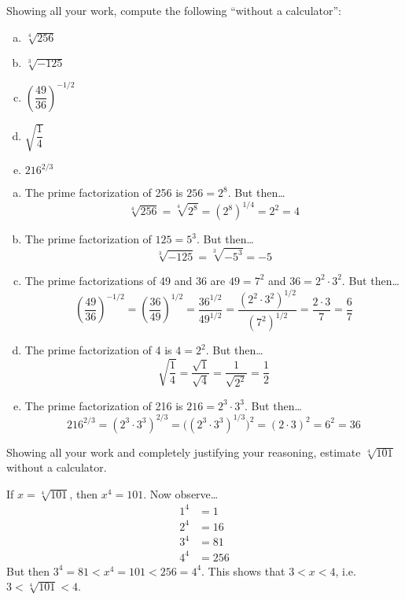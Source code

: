 \documentclass[11pt,letterpaper]{article}
\begin{document}

 Showing all your work, compute the following ``without a calculator'': 
	\begin{enumerate}[(a)]
	\item $\sqrt[4]{256}$
	\item $\sqrt[3]{-125}$
	\item $\left( \dfrac{49}{36} \right)^{-1/2}$
	\item $\sqrt{\dfrac{1}{4}}$
	\item $216^{2/3}$
	\end{enumerate} \pspace

\sol 
\begin{enumerate}[(a)]
\item The prime factorization of 256 is $256= 2^8$. But then\dots
	\[
	\sqrt[4]{256}= \sqrt[4]{2^8}= (2^8)^{1/4}= 2^2= 4
	\] \pspace

\item The prime factorization of $125= 5^3$. But then\dots
	\[
	\sqrt[3]{-125}= \sqrt[3]{-5^3}= -5
	\] \pspace

\item The prime factorizations of 49 and 36 are $49= 7^2$ and $36= 2^2 \cdot 3^2$. But then\dots
	\[
	\left( \dfrac{49}{36} \right)^{-1/2}= \left( \dfrac{36}{49} \right)^{1/2}= \dfrac{36^{1/2}}{49^{1/2}}= \dfrac{(2^2 \cdot 3^2)^{1/2}}{(7^2)^{1/2}}= \dfrac{2 \cdot 3}{7}= \dfrac{6}{7}
	\] \pspace

\item The prime factorization of 4 is $4= 2^2$. But then\dots
	\[
	\sqrt{\dfrac{1}{4}}= \dfrac{\sqrt{1}}{\sqrt{4}}= \dfrac{1}{\sqrt{2^2}}= \dfrac{1}{2}
	\] \pspace

\item The prime factorization of 216 is $216= 2^3 \cdot 3^3$. But then\dots
	\[
	216^{2/3}= (2^3 \cdot 3^3)^{2/3}= \big( (2^3 \cdot 3^3)^{1/3} \big)^2= (2 \cdot 3)^2= 6^2= 36
	\]
\end{enumerate}



\newpage



 Showing all your work and completely justifying your reasoning, estimate $\sqrt[4]{101}$ without a calculator. \pspace

\sol If $x= \sqrt[4]{101}$, then $x^4= 101$. Now observe\dots 
	\[
	\begin{aligned}
	1^4&= 1 \\
	2^4&= 16 \\
	3^4&= 81 \\
	4^4&= 256
	\end{aligned}
	\]
But then $3^4= 81 < x^4= 101 < 256= 4^4$. This shows that $3 < x < 4$, i.e. $3 < \sqrt[4]{101} < 4$. \pspace 
\end{document}
